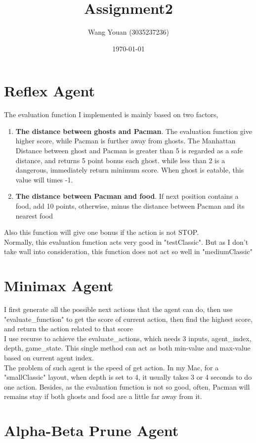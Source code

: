 \documentclass{article}
\title{Assignment2}
\author{Wang Youan (3035237236)}
\date{\today}
\begin{document}
	\maketitle
	\section{Reflex Agent}
	\label{sec:Q1}
	The evaluation function I implemented is mainly based on two factors,
	\begin{enumerate}
		\item \textbf{The distance between ghosts and Pacman}. The evaluation function give higher score, while Pacman is further away from ghosts. The Manhattan Distance between ghost and Pacman is greater than 5 is regarded as a safe distance, and returns 5 point bonus each ghost. while less than 2 is a dangerous, immediately return minimum score. When ghost is eatable, this value will times -1. 
		\item \textbf{The distance between Pacman and food}. If next position contains a food, add 10 points, otherwise, minus the distance between Pacman and its nearest food 
	\end{enumerate}
	Also this function will give one bonus if the action is not STOP.\\
	Normally, this evaluation function acts very good in "testClassic". But as I don't take wall into consideration, this function does not act so well in "mediumClassic"
	\section{Minimax Agent}
	\label{sec:Q2}
	I first generate all the possible next actions that the agent can do, then use "evaluate\_function" to get the score of current action, then find the highest score, and return the action related to that score\\
	I use recurse to achieve the evaluate\_actions, which needs 3 inputs, agent\_index, depth, game\_state. This single method can act as both min-value and max-value based on current agent index.\\
	The problem of such agent is the speed of get action. In my Mac, for a "smallClassic" layout, when depth is set to 4, it usually takes 3 or 4 seconds to do one action. Besides, as the evaluation function is not so good, often, Pacman will remains stay if both ghosts and food are a little far away from it.
	\section{Alpha-Beta Prune Agent}
	\label{sec:Q3}
	
\end{document}
